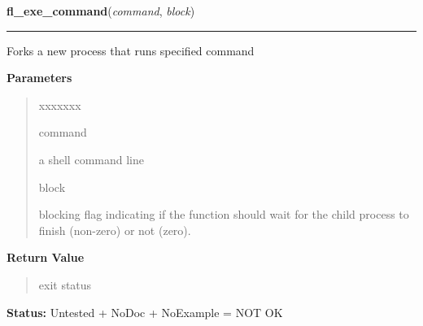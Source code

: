 \hspace{.8\funcindent}\begin{boxedminipage}{\funcwidth}

    \raggedright \textbf{fl\_exe\_command}(\textit{command}, \textit{block})

    \vspace{-1.5ex}

    \rule{\textwidth}{0.5\fboxrule}
\setlength{\parskip}{2ex}
    Forks a new process that runs specified command

\setlength{\parskip}{1ex}
      \textbf{Parameters}
      \vspace{-1ex}

      \begin{quote}
        \begin{Ventry}{xxxxxxx}

          \item[command]

          a shell command line

          \item[block]

          blocking flag indicating if the function should wait for the 
          child process to finish (non-zero) or not (zero).

        \end{Ventry}

      \end{quote}

      \textbf{Return Value}
    \vspace{-1ex}

      \begin{quote}
      exit status

      \end{quote}

\textbf{Status:} Untested + NoDoc + NoExample = NOT OK



    \end{boxedminipage}

    \label{xformslib:library:fl_end_command}

    \vspace{0.5ex}

